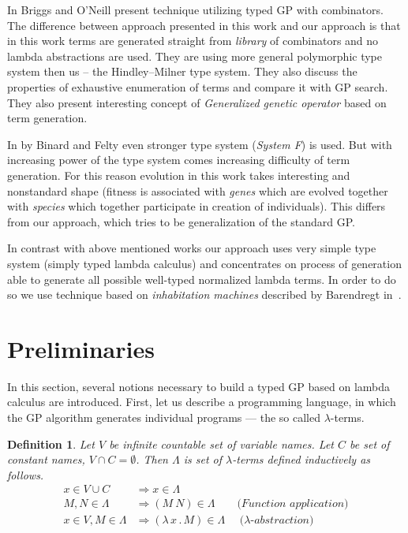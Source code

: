 \documentclass[conference]{IEEEtran}
\newtheorem{definition}{Definition}
\newcommand{\lets}{let us\xspace}
\newcommand{\lterms}{$\lambda$-terms\xspace}
\newcommand{\then}{\Rightarrow\xspace}
\newcommand{\lamb}[2]{( \lambda \, #1 \, . \, #2 )}
\begin{document}
In \cite{kes} Briggs and O’Neill present technique 
utilizing typed GP with combinators.
The difference between approach presented in this work
and our approach is that in this work terms are generated
straight from \textit{library} of combinators and no lambda abstractions
are used. They are using more general polymorphic type system then us
-- the Hindley–Milner type system. They also discuss the 
properties of exhaustive enumeration of terms and compare it with GP search.  
They also present interesting concept of \textit{Generalized
genetic operator} based on term generation. 

In \cite{binard2008genetic} by Binard and Felty even 
stronger type system (\textit{System F}) is used.  
But with increasing power of the type system comes increasing difficulty of term generation.
For this reason evolution in this work takes interesting and nonstandard shape 
(fitness is associated with \textit{genes} which are evolved together with \textit{species}
which together participate in creation of individuals).
This differs from our approach, which tries to be generalization of
the standard GP\cite{koza92}.

In contrast with above mentioned works our approach uses very simple type system 
(simply typed lambda calculus) and concentrates on process of generation  
able to generate all possible well-typed normalized lambda terms. In order to do
so we use technique based on \textit{inhabitation machines} 
described by Barendregt in~\cite{barendregt10}.    


\section{Preliminaries}
\label{preliminaries}

In this section, several notions necessary to build a typed GP based on lambda calculus are introduced. 
First, \lets describe a programming language, 
in which the GP algorithm generates individual programs --- the so called \lterms.\\

\begin{definition}
Let $V$ be infinite countable set of {\it 
variable names}. Let $C$ be set of {\it constant names}, 
$V \cap C = \emptyset$.	 	
Then $\Lambda$ is set of {\it \lterms} defined inductively as follows.	
\begin{align*}
x   \in V \cup C  &\then x     \in \Lambda \\
M,N \in \Lambda   &\then (M~N) \in \Lambda 
\textit{~~~~~~(Function application)} \\
x   \in V , M \in \Lambda &\then \lamb{x}{M} \in \Lambda
\textit{~~~~($\lambda$-abstraction)} 
\end{align*}
\end{definition}
~\\
\end{document}
